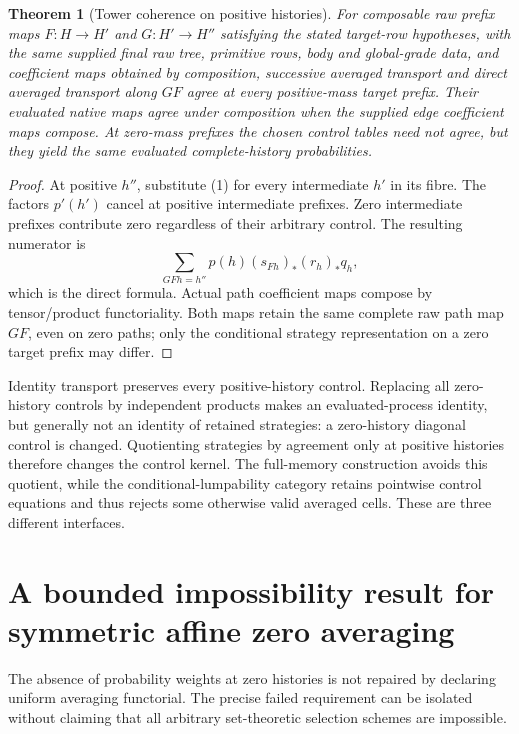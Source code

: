 \documentclass[11pt]{article}
\newtheorem{theorem}{Theorem}\newtheorem{proposition}[theorem]{Proposition}
\begin{document}
\begin{theorem}[Tower coherence on positive histories]
For composable raw prefix maps $F:H\to H'$ and $G:H'\to H''$ satisfying the stated target-row hypotheses, with the same supplied final raw tree, primitive rows, body and global-grade data, and coefficient maps obtained by composition, successive averaged transport and direct averaged transport along $GF$ agree at every positive-mass target prefix. Their evaluated native maps agree under composition when the supplied edge coefficient maps compose. At zero-mass prefixes the chosen control tables need not agree, but they yield the same evaluated complete-history probabilities.
\end{theorem}
\begin{proof}
At positive $h''$, substitute (1) for every intermediate $h'$ in its fibre. The factors $p'(h')$ cancel at positive intermediate prefixes. Zero intermediate prefixes contribute zero regardless of their arbitrary control. The resulting numerator is
\[
 \sum_{GFh=h''}p(h)(s_{Fh})_*(r_h)_*q_h,
\]
which is the direct formula. Actual path coefficient maps compose by tensor/product functoriality. Both maps retain the same complete raw path map $GF$, even on zero paths; only the conditional strategy representation on a zero target prefix may differ.\end{proof}

Identity transport preserves every positive-history control. Replacing all zero-history controls by independent products makes an evaluated-process identity, but generally not an identity of retained strategies: a zero-history diagonal control is changed. Quotienting strategies by agreement only at positive histories therefore changes the control kernel. The full-memory construction avoids this quotient, while the conditional-lumpability category retains pointwise control equations and thus rejects some otherwise valid averaged cells. These are three different interfaces.

\section{A bounded impossibility result for symmetric affine zero averaging}
The absence of probability weights at zero histories is not repaired by declaring uniform averaging functorial. The precise failed requirement can be isolated without claiming that all arbitrary set-theoretic selection schemes are impossible.
\end{document}
